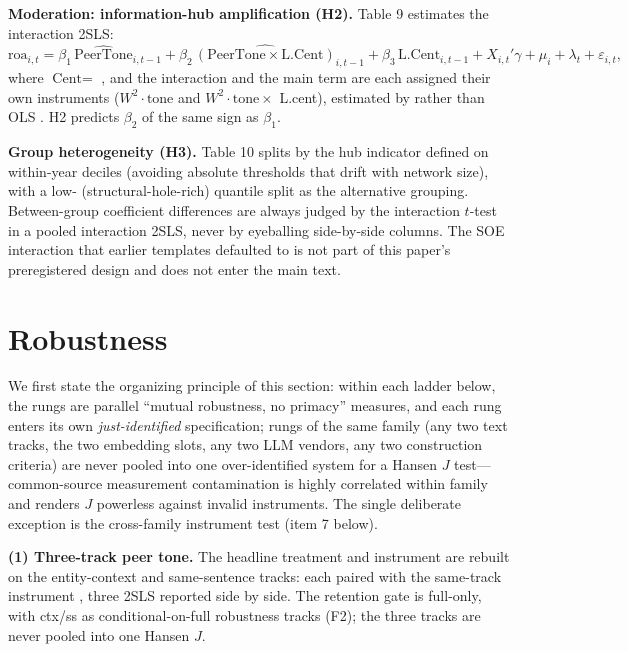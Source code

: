 \textbf{Moderation: information-hub amplification (H2).} Table 9
estimates the interaction 2SLS:
\begin{equation}
\text{roa}_{i,t} = \beta_{1}\,\widehat{\text{PeerTone}}_{i,t-1}
 + \beta_{2}\,\widehat{(\text{PeerTone} \times
 \text{L.Cent})}_{i,t-1}
 + \beta_{3}\,\text{L.Cent}_{i,t-1}
 + X_{i,t}'\gamma + \mu_{i} + \lambda_{t} + \varepsilon_{i,t},
\label{eq:moderation}
\end{equation}
where $\text{Cent} = $ , and the
interaction  and the main term are each assigned
their own instruments ($W^{2}\cdot\text{tone}$ and
$W^{2}\cdot\text{tone} \times$ L.cent), estimated by
 rather than OLS
\parencite{brambor2006understanding}. H2 predicts $\beta_{2}$ of
the same sign as $\beta_{1}$. 

\textbf{Group heterogeneity (H3).} Table 10 splits by the hub
indicator  defined on within-year deciles
(avoiding absolute thresholds that drift with network size), with a
low- (structural-hole-rich) quantile split as
the alternative grouping. Between-group coefficient differences are
always judged by the interaction $t$-test in a pooled interaction
2SLS, never by eyeballing side-by-side columns.
 The SOE interaction that
earlier templates defaulted to is not part of this paper's
preregistered design and does not enter the main text.

\section{Robustness}\label{sec:robust}

We first state the organizing principle of this section: within each
ladder below, the rungs are parallel ``mutual robustness, no
primacy'' measures, and each rung enters its own
\emph{just-identified} specification; rungs of the same family (any
two text tracks, the two embedding slots, any two LLM vendors, any
two construction criteria) are never pooled into one over-identified
system for a Hansen $J$ test---common-source measurement
contamination is highly correlated within family and renders $J$
powerless against invalid instruments. The single deliberate
exception is the cross-family instrument test (item 7 below).

\textbf{(1) Three-track peer tone.} The headline treatment and
instrument are rebuilt on the entity-context and same-sentence
tracks:  each paired with
the same-track instrument
, three 2SLS reported
side by side. The retention gate is full-only, with ctx/ss as
conditional-on-full robustness tracks (F2); the three tracks are
never pooled into one Hansen $J$.

